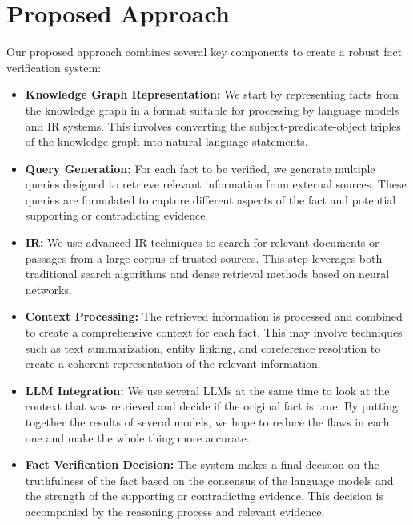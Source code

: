 \section{Proposed Approach}\label{sec:approach}
Our proposed approach combines several key components to create a robust fact verification system:
\begin{itemize}
    \item \textbf{Knowledge Graph Representation:} We start by representing facts from the knowledge graph in a format suitable for processing by language models and \ac{IR} systems. This involves converting the subject-predicate-object triples of the knowledge graph into natural language statements.
    \item \textbf{Query Generation:} For each fact to be verified, we generate multiple queries designed to retrieve relevant information from external sources. These queries are formulated to capture different aspects of the fact and potential supporting or contradicting evidence.
    \item \textbf{\ac{IR}:} We use advanced \ac{IR} techniques to search for relevant documents or passages from a large corpus of trusted sources. This step leverages both traditional search algorithms and dense retrieval methods based on neural networks.
    \item \textbf{Context Processing:} The retrieved information is processed and combined to create a comprehensive context for each fact. This may involve techniques such as text summarization, entity linking, and coreference resolution to create a coherent representation of the relevant information.
    \item \textbf{\ac{LLM} Integration:} We use several \ac{LLMs} at the same time to look at the context that was retrieved and decide if the original fact is true. By putting together the results of several models, we hope to reduce the flaws in each one and make the whole thing more accurate.
    \item \textbf{Fact Verification Decision:} The system makes a final decision on the truthfulness of the fact based on the consensus of the language models and the strength of the supporting or contradicting evidence. This decision is accompanied by the reasoning process and relevant evidence.
\end{itemize}

